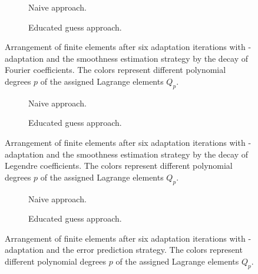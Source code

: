 \begin{figure}
\begin{subfigure}{1\textwidth}
  \centering
  
  \caption{Naive approach.}
\end{subfigure}
\begin{subfigure}{1\textwidth}
  \centering
  
  \caption{Educated guess approach.}
\end{subfigure}
\caption[Arrangement of finite elements with \hp-adaptation and the Fourier coefficient decay strategy.]{Arrangement of finite elements after six adaptation iterations with \hp-adaptation and the smoothness estimation strategy by the decay of Fourier coefficients. The colors represent different polynomial degrees $p$ of the assigned Lagrange elements $Q_p$.}
\label{fig:meshfourier}
\end{figure}

\begin{figure}
\begin{subfigure}{1\textwidth}
  \centering
  
  \caption{Naive approach.}
\end{subfigure}
\begin{subfigure}{1\textwidth}
  \centering
  
  \caption{Educated guess approach.}
\end{subfigure}
\caption[Arrangement of finite elements with \hp-adaptation and the Legendre coefficient decay strategy.]{Arrangement of finite elements after six adaptation iterations with \hp-adaptation and the smoothness estimation strategy by the decay of Legendre coefficients. The colors represent different polynomial degrees $p$ of the assigned Lagrange elements $Q_p$.}
\label{fig:meshlegendre}
\end{figure}

\begin{figure}
\begin{subfigure}{1\textwidth}
  \centering
  
  \caption{Naive approach.}
\end{subfigure}
\begin{subfigure}{1\textwidth}
  \centering
  
  \caption{Educated guess approach.}
\end{subfigure}
\caption[Arrangement of finite elements with \hp-adaptation and the error prediction strategy.]{Arrangement of finite elements after six adaptation iterations with \hp-adaptation and the error prediction strategy. The colors represent different polynomial degrees $p$ of the assigned Lagrange elements $Q_p$.}
\label{fig:meshprediction}
\end{figure}